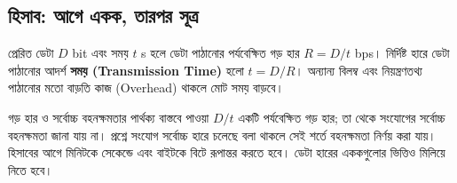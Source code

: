 \subsection{হিসাব: আগে একক, তারপর সূত্র}
প্রেরিত ডেটা $D$ bit এবং সময় $t$ s হলে ডেটা পাঠানোর পর্যবেক্ষিত গড় হার $R=D/t$ bps। নির্দিষ্ট হারে ডেটা পাঠানোর আদর্শ \textbf{সময় (Transmission Time)} হলো $t=D/R$। অন্যান্য বিলম্ব এবং নিয়ন্ত্রণতথ্য পাঠানোর মতো বাড়তি কাজ (Overhead) থাকলে মোট সময় বাড়বে।
\begin{mistakebox}{গড় হার ও সর্বোচ্চ বহনক্ষমতার পার্থক্য}
বাস্তবে পাওয়া $D/t$ একটি পর্যবেক্ষিত গড় হার; তা থেকে সংযোগের সর্বোচ্চ বহনক্ষমতা জানা যায় না। প্রশ্নে সংযোগ সর্বোচ্চ হারে চলেছে বলা থাকলে সেই শর্তে বহনক্ষমতা নির্ণয় করা যায়। হিসাবের আগে মিনিটকে সেকেন্ডে এবং বাইটকে বিটে রূপান্তর করতে হবে। ডেটা হারের এককগুলোর ভিত্তিও মিলিয়ে নিতে হবে।
\end{mistakebox}

